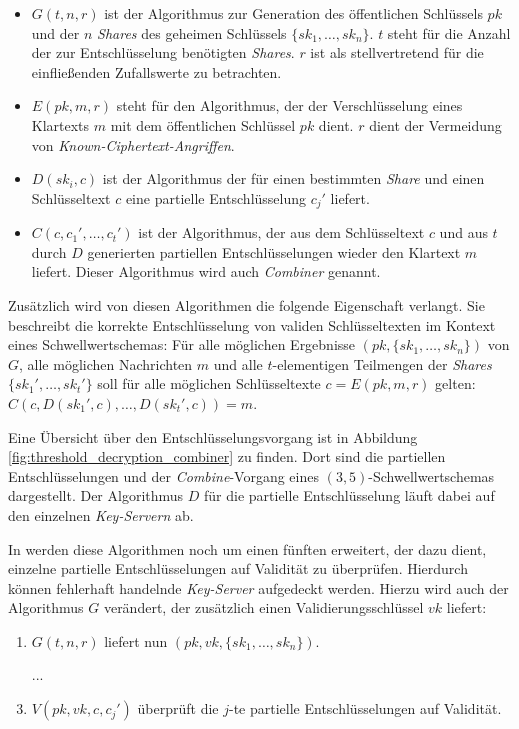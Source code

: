 \begin{itemize}
  \item \(G(t, n, r)\) ist der Algorithmus zur Generation des öffentlichen Schlüssels \(pk\) und der \(n\) \textit{Shares} des geheimen Schlüssels \(\{sk_1, \dots, sk_n\}\). \(t\) steht für die Anzahl der zur Entschlüsselung benötigten \textit{Shares}. \(r\) ist als stellvertretend für die einfließenden Zufallswerte zu betrachten.
  
  \item \(E(pk, m, r)\) steht für den Algorithmus, der der Verschlüsselung eines Klartexts \(m\) mit dem öffentlichen Schlüssel \(pk\) dient. \(r\) dient der Vermeidung von \textit{Known-Ciphertext-Angriffen}. 
  
  \item \(D(sk_i, c)\) ist der Algorithmus der für einen bestimmten \textit{Share} und einen Schlüsseltext \(c\) eine partielle Entschlüsselung \(c_j'\) liefert.
  
  \item \(C(c, c_1', \dots, c_t')\) ist der Algorithmus, der aus dem Schlüsseltext \(c\) und aus \(t\) durch \(D\) generierten partiellen Entschlüsselungen wieder den Klartext \(m\) liefert. Dieser Algorithmus wird auch \textit{Combiner} genannt. 
\end{itemize}

Zusätzlich wird von diesen Algorithmen die folgende Eigenschaft verlangt. Sie beschreibt die korrekte Entschlüsselung von validen Schlüsseltexten im Kontext eines Schwellwertschemas: Für alle möglichen Ergebnisse \((pk, \{sk_1, \dots, sk_n\})\) von \(G\), alle möglichen Nachrichten \(m\) und alle \(t\)-elementigen Teilmengen der \textit{Shares} \(\{sk_1', \dots, sk_t'\}\) soll für alle möglichen Schlüsseltexte \(c=E(pk, m, r)\) gelten: \(C(c, D(sk_1', c), \dots, D(sk_t', c)) = m\).

Eine Übersicht über den Entschlüsselungsvorgang ist in Abbildung \ref{fig:threshold_decryption_combiner} zu finden. Dort sind die partiellen Entschlüsselungen und der \textit{Combine}-Vorgang eines \((3,5)\)-Schwellwertschemas dargestellt. Der Algorithmus \(D\) für die partielle Entschlüsselung läuft dabei auf den einzelnen \textit{Key-Servern} ab.

In \cite{boneh2006} werden diese Algorithmen noch um einen fünften erweitert, der dazu dient, einzelne partielle Entschlüsselungen auf Validität zu überprüfen. Hierdurch können fehlerhaft handelnde \textit{Key-Server} aufgedeckt werden. Hierzu wird auch der Algorithmus \(G\) verändert, der zusätzlich einen Validierungsschlüssel \(vk\) liefert:
\begin{enumerate}
	\item \(G(t, n, r)\) liefert nun \((pk, vk, \{sk_1, \dots, sk_n\})\).
  \item[...] 
  \setcounter{enumi}{4}
	\item \(V(pk, vk, c, c_j')\) überprüft die \(j\)-te partielle Entschlüsselungen auf Validität.
\end{enumerate}

